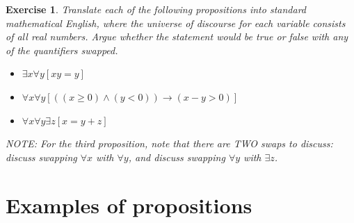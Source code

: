 \documentclass{book}
\newcounter{ekcounter}%
\theoremstyle{ekimcustom}
\newtheorem{exercise}[ekcounter]{Exercise}
\begin{document}
\begin{exercise}
Translate each of the following propositions into standard mathematical English, where the universe of discourse for each variable consists of all real numbers. Argue whether the statement would be true or false with any of the quantifiers swapped.
\begin{itemize}
\item $\exists x \forall y [xy=y]$
\item $\forall x \forall y [ ((x \geq 0) \wedge (y < 0)) \rightarrow (x-y > 0)]$
\item $\forall x \forall y \exists z [x=y+z]$
\end{itemize}
NOTE: For the third proposition, note that there are TWO  swaps to discuss: discuss swapping $\forall x$ with $\forall y$, and discuss swapping $\forall y$ with $\exists z$.
\end{exercise}

\section{Examples of propositions}\label{section:examples-of-assumed-propositions}
\end{document}
